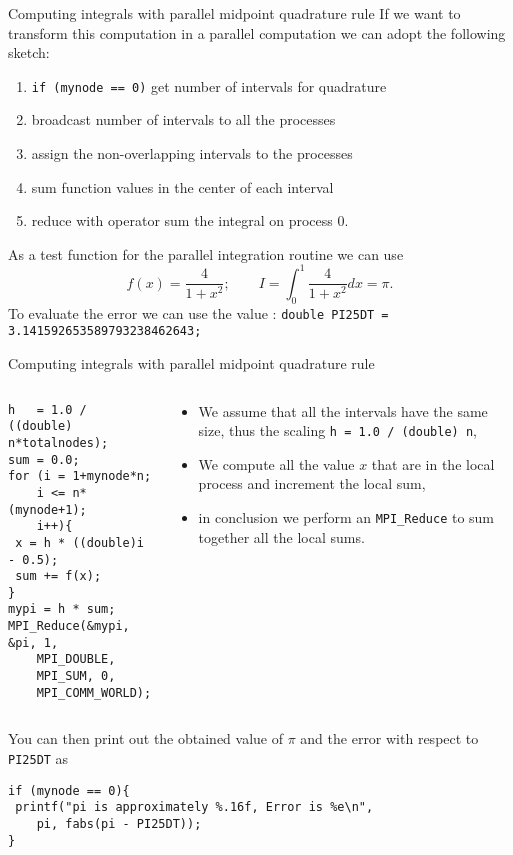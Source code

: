 \documentclass[xcolor={svgnames,usenames}]{beamer}
\begin{document}
\begin{frame}{Computing integrals with parallel midpoint quadrature rule}
If we want to transform this computation in a parallel computation we can adopt the following sketch:
\begin{enumerate}
	\item \texttt{if (mynode == 0)} get number of intervals for quadrature
	\item broadcast number of intervals to all the processes
	\item assign the non-overlapping intervals to the processes
	\item sum function values in the center of each interval
	\item reduce with operator sum the integral on process 0.
\end{enumerate}
As a test function for the parallel integration routine we can use
\begin{equation*}
f(x) = \frac{4}{1+x^2}; \qquad I = \int_{0}^{1} \frac{4}{1+x^2} dx = \pi.
\end{equation*}
To evaluate the error we can use the value : \texttt{double PI25DT = 3.141592653589793238462643;}
\end{frame}

\begin{frame}[fragile]{Computing integrals with parallel midpoint quadrature rule}
\small
\begin{columns}
\begin{column}{0.4\columnwidth}
\begin{verbatim}
h   = 1.0 / ((double) n*totalnodes);
sum = 0.0;
for (i = 1+mynode*n;
	i <= n*(mynode+1);
	i++){
 x = h * ((double)i - 0.5);
 sum += f(x);
}
mypi = h * sum;
MPI_Reduce(&mypi, &pi, 1, 
	MPI_DOUBLE, 
	MPI_SUM, 0, 
	MPI_COMM_WORLD);
\end{verbatim}
\end{column}
\begin{column}{0.6\columnwidth}
	\begin{itemize}
	\item We assume that all the intervals have the same size, thus the scaling \texttt{h   = 1.0 / (double) n},
	\item We compute all the value $x$ that are in the local process and increment the local sum,
	\item in conclusion we perform an \texttt{MPI_Reduce} to sum together all the local sums. 
	\end{itemize}
\end{column}
\end{columns}

\vfill
You can then print out the obtained value of $\pi$ and the error with respect to \texttt{PI25DT} as
\begin{verbatim}
if (mynode == 0){
 printf("pi is approximately %.16f, Error is %e\n",
 	pi, fabs(pi - PI25DT));
}
\end{verbatim}
\end{frame}
\end{document}
